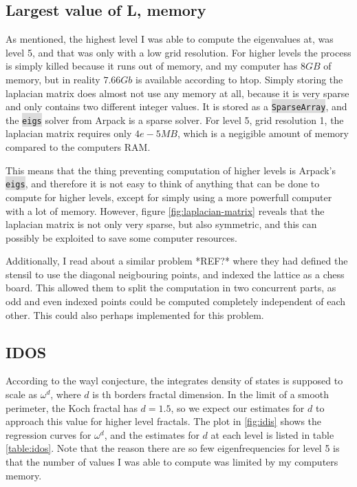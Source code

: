 \documentclass{article}
\begin{document}
\subsection{Largest value of L, memory}
As mentioned, the highest level I was able to compute the eigenvalues at, was level 5, and that was only with a low grid resolution. For higher levels the process is simply killed because it runs out of memory, and my computer has $8GB$ of memory, but in reality $7.66Gb$ is available according to htop. Simply storing the laplacian matrix does almost not use any memory at all, because it is very sparse and only contains two different integer values. It is stored as a
\colorbox{gainsboro}{\lstinline{SparseArray}}, and the \colorbox{gainsboro}{\lstinline{eigs}} solver from Arpack is a sparse solver. For level 5, grid resolution 1, the laplacian matrix requires only $4e-5 MB$, which is a negigible amount of memory compared to the computers RAM. 

This means that the thing preventing computation of higher levels is Arpack's \colorbox{gainsboro}{\lstinline{eigs}}, and therefore it is not easy to think of anything that can be done to compute for higher levels, except for simply using a more powerfull computer with a lot of memory. However, figure \ref{fig:laplacian-matrix} reveals that the laplacian matrix is not only very sparse, but also symmetric, and this can possibly be exploited to save
some computer resources.

Additionally, I read about a similar problem *REF?* where they had defined the stensil to use the diagonal neigbouring points, and indexed the lattice as a chess board. This allowed them to split the computation in two concurrent parts, as odd and even indexed points could be computed completely independent of each other. This could also perhaps implemented for this problem.

\subsection{IDOS}
According to the wayl conjecture, the integrates density of states is supposed to scale as $\omega^{d}$, where $d$ is th borders fractal dimension. In the limit of a smooth perimeter, the Koch fractal has $d = 1.5$, so we expect our estimates for $d$ to approach this value for higher level fractals. The plot in \ref{fig:idis} shows the regression curves for $\omega ^{d}$, and the estimates for $d$ at each level is listed in table \ref{table:idos}. Note that the reason there are so few
eigenfrequencies for level 5 is that the number of values I was able to compute was limited by my computers memory.\\
\end{document}
